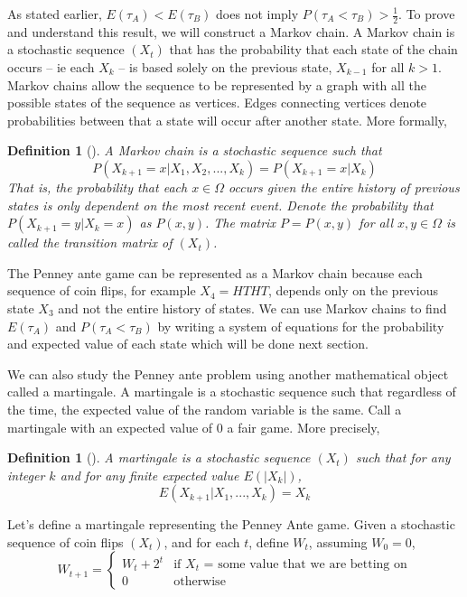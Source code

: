 \documentclass{article}
\newtheorem{definition}[theorem]{Definition}
\numberwithin{mytheorem}{subsection} %
\begin{document}
		As stated earlier, $E(\tau_A) < E(\tau_B)$ does not imply $P(\tau_A < \tau_B) > \frac{1}{2}$. To prove and understand this result, we will construct a Markov chain. A Markov chain is a stochastic sequence $(X_t)$ that has the probability that each state of the chain occurs -- ie each $X_k$ -- is based solely on the previous state, $X_{k-1}$ for all $k > 1$. Markov chains allow the sequence to be represented by a graph with all the possible states of the sequence as vertices. Edges connecting vertices denote probabilities between that a state will occur after another state. More formally,

		\begin{definition}[\cite{textbook}]
			A {\em Markov chain} is a stochastic sequence such that
			$$P(X_{k+1} = x | X_1, X_2, ..., X_k) = P(X_{k+1} = x  | X_k)$$
			That is, the probability that each $x \in \Omega$ occurs given the entire history of
			previous states is only dependent on the most recent event. Denote the probability
			that $P(X_{k+1}=y|X_k=x)$ as $P(x,y)$. The matrix $P = P(x,y)$ for all $x,y \in \Omega$ is called the transition matrix of $(X_t)$.
		\end{definition}

		The Penney ante game can be represented as a Markov chain because each sequence of coin flips, for example $X_4=HTHT$, depends only on the previous state $X_3$ and not the entire history of states. We can use Markov chains to find $E(\tau_A)$ and $P(\tau_A < \tau_B)$ by writing a system of equations for the probability and expected value of each state which will be done next section. 

		We can also study the Penney ante problem using another mathematical object called a martingale. A martingale is a stochastic sequence such that regardless of the time, the expected value of the random variable is the same. Call a martingale with an expected value of 0 a fair game. More precisely,

		\begin{definition}[\cite{li}]
			A {\em martingale} is a stochastic sequence $(X_t)$ such that for any
			integer $k$ and for any finite expected value $E(|X_k|)$, $$E(X_{k+1} | X_1, ..., X_k) = X_k$$		
		\end{definition}

	    Let's define a martingale representing the Penney Ante game. Given a stochastic sequence of coin flips $(X_t)$, and for each $t$, define $W_t$, assuming $W_0=0$,
	    \[ W_{t+1}=\begin{cases} 
	      W_{t} + 2^t & \text{if $X_t$ = some value that we are betting on}\\
	      0 & \text{otherwise} 
		  \end{cases} \]
\end{document}
